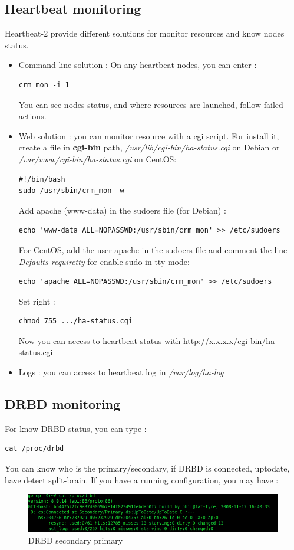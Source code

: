 \documentclass[a4paper,10pt]{report}
\begin{document}
\subsection{Heartbeat monitoring}
\label{hb-monitor}
Heartbeat-2 provide different solutions for monitor resources and know nodes status.
\begin{itemize}
 \item Command line solution : On any heartbeat nodes, you can enter :
\begin{lstlisting}
crm_mon -i 1
\end{lstlisting}
You can see nodes status, and where resources are launched, follow failed actions.
\item Web solution : you can monitor resource with a cgi script. For install it, create a file in \textbf{cgi-bin} path, \textit{/usr/lib/cgi-bin/ha-status.cgi} on Debian or \textit{/var/www/cgi-bin/ha-status.cgi} on CentOS:
\begin{lstlisting}
#!/bin/bash
sudo /usr/sbin/crm_mon -w
\end{lstlisting}
Add apache (www-data) in the sudoers file (for Debian) :
\begin{lstlisting}
echo 'www-data ALL=NOPASSWD:/usr/sbin/crm_mon' >> /etc/sudoers
\end{lstlisting}
For CentOS, add the user apache in the sudoers file and comment the line  \textit{Defaults  requiretty} for enable sudo in tty mode:
\begin{lstlisting}
echo 'apache ALL=NOPASSWD:/usr/sbin/crm_mon' >> /etc/sudoers
\end{lstlisting}
Set right :
\begin{lstlisting}
chmod 755 .../ha-status.cgi
\end{lstlisting}
Now you can access to heartbeat status with http://x.x.x.x/cgi-bin/ha-status.cgi
\item Logs : you can access to heartbeat log in \textit{/var/log/ha-log}

\end{itemize}


\subsection{DRBD monitoring}
For know DRBD status, you can type :\\
\begin{lstlisting}
cat /proc/drbd
\end{lstlisting}


You can know who is the primary/secondary, if DRBD is connected, uptodate, have detect split-brain. If you have a running configuration, you may have :
\begin{figure}[!h]
\begin{center}
\includegraphics[scale=0.5]{schema/drbd-s-p.png}
\end{center}
\caption{DRBD secondary primary} 
\label{hb-gui-2nodes} 
\end{figure}
\end{document}
